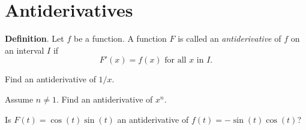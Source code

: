 \documentclass[../main.tex]{subfiles}
\begin{document}

\section{Antiderivatives}

\begin{mdframed}[style=withref]
  \textbf{Definition}. Let \(f\) be a function. A function \(F\) is called an \emph{antiderivative} of \(f\) on an interval \(I\) if 
  \[
    {F'(x) = f(x) \text{ for all } x \text{ in } I.}
  \]

\end{mdframed}

\begin{example}
  Find an antiderivative of \(1/x\).
\end{example}
\vspace{1in}

\begin{example}
  Assume \(n \ne 1\). Find an antiderivative of \(x^{n}\).
\end{example}
\vspace{2in}

\begin{example}
  Is \(F(t) = \cos(t)\sin(t)\) an antiderivative of \(f(t) = -\sin(t)\cos(t)\)?

\end{example}
\vspace{1in}
\end{document}
